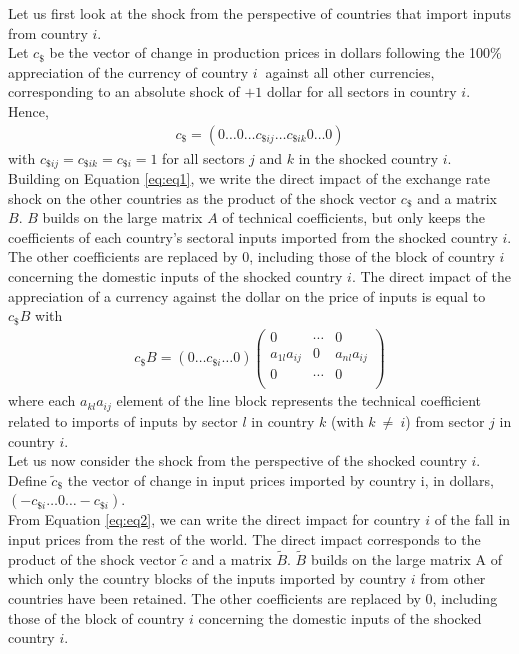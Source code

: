 \documentclass[11pt,a4paper]{article}
\begin{document}
Let us first look at the shock from the perspective of countries that import inputs from country $i$.\\
Let ${{c}_{\$}}$ be the vector of change in production prices in dollars following the 100$\%$ appreciation of the currency of country $i~$ against all other currencies, corresponding to an absolute shock of $+1$ dollar for all sectors in country $i$. \\
Hence,
\begin{eqnarray*}
 c_\$=\left(0\ldots0\ldots c_{\$ij}\ldots c_{\$ik} 0\ldots0\right)
\end{eqnarray*}
with $c_{\$ij}=c_{\$ik}=c_{\$i}=1$
for all sectors $j$ and $k$ in the shocked country $i$.\\
Building on Equation \ref{eq:eq1}, we write the direct impact of the exchange rate shock on the other countries as the product of the shock vector $c_{\$}$ and a matrix $B$. $B$ builds on the large matrix $A$ of technical coefficients, but only keeps the coefficients of each country's sectoral inputs imported from the shocked country $i$. The other coefficients are replaced by 0, including those of the block of country $i$ concerning the domestic inputs of the shocked country $i$. The direct impact of the appreciation of a currency against the dollar on the price of inputs is equal to $c_{\$}B$ with
\begin{eqnarray}
{c_{\$}}B=\left(0\ldots c_{\$i}\ldots 0\right)\left(\begin{matrix}0&\cdots&0\\a_{1l}a_{ij}&0&a_{nl}a_{ij}\\0&\cdots&0\\\end{matrix}\right) 	
\label{eq:eq3}
\end{eqnarray}
where each ${{{a}}_{{kl}}}{{{a}}_{{ij}}}$ element of the line block represents the technical coefficient related to imports of inputs by sector $l$ in country $k$ (with $k~\ne ~i$) from sector $j$ in country $i$.\\
Let us now consider the shock from the perspective of the shocked country $i$.\\
Define ${{\tilde{c}}_{\$}}$ the vector of change in input prices imported by country i, in dollars, $( -c_{\$i}\ldots0\ldots-c_{\$i})$. \\
From Equation \ref{eq:eq2}, we can write the direct impact for country $i$ of the fall in input prices from the rest of the world. The direct impact corresponds to the product of the shock vector ${\tilde{c}}$  and a matrix ${\tilde{B}}$. ${\tilde{B}}$ builds on the large matrix A of which only the country blocks of the inputs imported by country $i$ from other countries have been retained. The other coefficients are replaced by 0, including those of the block of country $i$ concerning the domestic inputs of the shocked country $i$. \\
\end{document}
